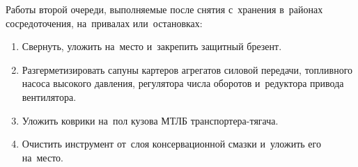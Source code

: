 Работы второй очереди, выполняемые после снятия с~хранения в~районах сосредоточения, на~привалах или~остановках: 
\begin{enumerate}
    \item Свернуть, уложить на~место и~закрепить защитный брезент. 
    \item Разгерметизировать сапуны картеров агрегатов силовой передачи, топливного насоса высокого давления, регулятора числа оборотов и~редуктора привода вентилятора. 
    \item Уложить коврики на~пол кузова МТЛБ транспортера-тягача. 
    \item Очистить инструмент от~слоя консервационной смазки и~уложить его на~место.
\end{enumerate}


